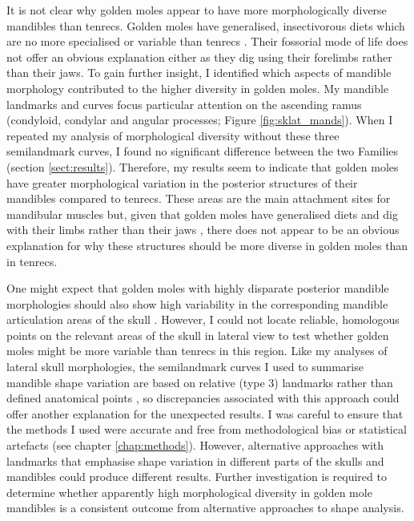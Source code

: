 	It is not clear why golden moles appear to have more morphologically diverse mandibles than tenrecs. Golden moles have generalised, insectivorous diets \citep{Bronner1995} which are no more specialised or variable than tenrecs \citep{Soarimalala2011}. Their fossorial mode of life does not offer an obvious explanation either as they dig using their forelimbs rather than their jaws.
	To gain further insight, I identified which aspects of mandible morphology contributed to the higher diversity in golden moles. My mandible landmarks and curves focus particular attention on the ascending ramus (condyloid, condylar and angular processes; Figure \ref{fig:sklat_mands}). When I repeated my analysis of morphological diversity without these three semilandmark curves, I found no significant difference between the two Families (section \ref{sect:results}). Therefore, my results seem to indicate that golden moles have greater morphological variation in the posterior structures of their mandibles compared to tenrecs. These areas are the main attachment sites for mandibular muscles but, given that golden moles have generalised diets and dig with their limbs rather than their jaws \citep{Bronner1995}, there does not appear to be an obvious explanation for why these structures should be more diverse in golden moles than in tenrecs.
	
	One might expect that golden moles with highly disparate posterior mandible morphologies should also show high variability in the corresponding mandible articulation areas of the skull \citep[although developmental genetics studies have revealed that mandibles can also develop shape variation independently of skulls; ][] {Rot-Nikcevic2007}. However, I could not locate reliable, homologous points on the relevant areas of the skull in lateral view to test whether golden moles might be more variable than tenrecs in this region. Like my analyses of lateral skull morphologies, the semilandmark curves I used to summarise mandible shape variation are based on relative (type 3) landmarks rather than defined anatomical points \citep{Zelditch2012}, so discrepancies associated with this approach could offer another explanation for the unexpected results. I was careful to ensure that the methods I used were accurate and free from methodological bias or statistical artefacts (see chapter \ref{chap:methods}). However, alternative approaches with landmarks that emphasise shape variation in different parts of the skulls and mandibles could produce different results. Further investigation is required to determine whether apparently high morphological diversity in golden mole mandibles is a consistent outcome from alternative approaches to shape analysis. 

